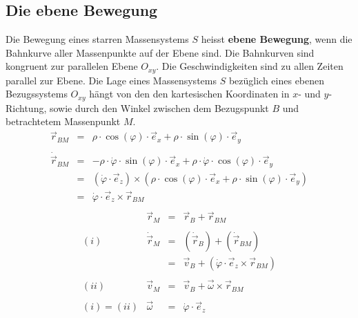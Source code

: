 \subsection{Die ebene Bewegung}
Die Bewegung eines starren Massensystems $S$ heisst \textbf{ebene Bewegung}, wenn die Bahnkurve aller Massenpunkte auf der Ebene sind. Die Bahnkurven sind kongruent zur parallelen Ebene $O_{xy}$. Die Geschwindigkeiten sind zu allen Zeiten parallel zur Ebene. 
\newline\newline
Die Lage eines Massensystems $S$ bezüglich eines ebenen Bezugssystems $O_{xy}$ hängt von den den kartesischen Koordinaten in $x$- und $y$-Richtung, sowie durch den Winkel zwischen dem Bezugspunkt $B$ und betrachtetem Massenpunkt $M$. 
\begin{equation}
\boxed{\begin{array}{lll}
\overrightarrow{r}_{BM}&=&\rho\cdot \cos\left(\varphi\right)\cdot \overrightarrow{e}_x+\rho\cdot \sin\left(\varphi\right)\cdot \overrightarrow{e}_y\\\\
\dot{\overrightarrow{r}}_{BM}&=&-\rho\cdot \dot{\varphi}\cdot \sin\left(\varphi\right)\cdot \overrightarrow{e}_x+\rho\cdot \dot{\varphi}\cdot \cos\left(\varphi\right)\cdot \overrightarrow{e}_y\\
&=&\left(\dot{\varphi}\cdot \overrightarrow{e}_z\right)\times\left(\rho\cdot \cos\left(\varphi\right)\cdot \overrightarrow{e}_x+\rho\cdot \sin\left(\varphi\right)\cdot \overrightarrow{e}_y\right)\\
&=&\dot{\varphi}\cdot \overrightarrow{e}_z\times \overrightarrow{r}_{BM}\\
\end{array}}
\end{equation}
\begin{equation}
\boxed{
\begin{array}{llll}
&\overrightarrow{r}_M&=&\overrightarrow{r}_B+\overrightarrow{r}_{BM}\\\\
(i)&\dot{\overrightarrow{r}}_M&=&\left(\dot{\overrightarrow{r}}_B\right)+\left(\dot{\overrightarrow{r}}_{BM}\right)\\
&&=&\overrightarrow{v}_B+\left(\dot{\varphi}\cdot \overrightarrow{e}_z\times \overrightarrow{r}_{BM}\right)\\\\
(ii)&\overrightarrow{v}_M&=&\overrightarrow{v}_B+\overrightarrow{\omega}\times \overrightarrow{r}_{BM}\\\\
(i)=(ii)&\overrightarrow{\omega}&=&\dot{\varphi}\cdot \overrightarrow{e}_z
\end{array}}
\end{equation}
